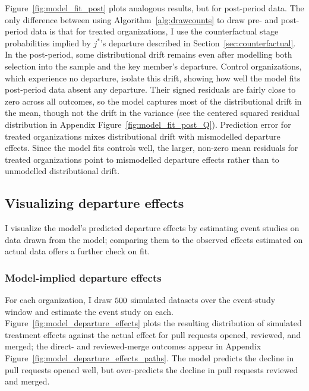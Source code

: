 \documentclass[12pt,notitlepage]{article}
\begin{document}
Figure~\ref{fig:model_fit_post} plots analogous results, but for post-period data.
The only difference between using Algorithm~\ref{alg:drawcounts} to draw pre- and post-period data is that for treated organizations, I use the counterfactual stage probabilities implied by $j^*$'s departure described in Section~\ref{sec:counterfactual}.
In the post-period, some distributional drift remains even after modelling both selection into the sample and the key member's departure.
Control organizations, which experience no departure, isolate this drift, showing how well the model fits post-period data absent any departure.
Their signed residuals are fairly close to zero across all outcomes, so the model captures most of the distributional drift in the mean, though not the drift in the variance (see the centered squared residual distribution in Appendix Figure~\ref{fig:model_fit_post_Q}).
Prediction error for treated organizations mixes distributional drift with mismodelled departure effects.
Since the model fits controls well, the larger, non-zero mean residuals for treated organizations point to mismodelled departure effects rather than to unmodelled distributional drift.


\subsection{Visualizing departure effects}
I visualize the model's predicted departure effects by estimating event studies on data drawn from the model; comparing them to the observed effects estimated on actual data offers a further check on fit.

\subsubsection{Model-implied departure effects}

For each organization, I draw $500$ simulated datasets over the event-study window and estimate the event study on each.
Figure~\ref{fig:model_departure_effects} plots the resulting distribution of simulated treatment effects against the actual effect for pull requests opened, reviewed, and merged; the direct- and reviewed-merge outcomes appear in Appendix Figure~\ref{fig:model_departure_effects_paths}.
The model predicts the decline in pull requests opened well, but over-predicts the decline in pull requests reviewed and merged.
\end{document}
